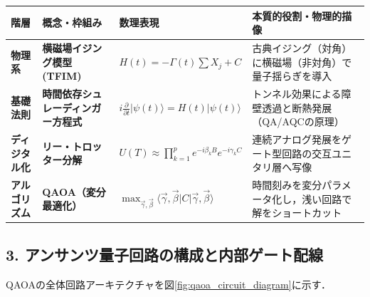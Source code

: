 \documentclass[11pt,a4paper,oneside,openany]{ltjsbook}
\theoremstyle{definition}
\theoremstyle{plain}
\theoremstyle{remark}
\newcommand{\ket}[1]{|#1\rangle}
\newcommand{\bra}[1]{\langle#1|}
\begin{document}
\begin{insightbox}
\centering
\footnotesize
\begin{tabular}{p{1.2cm}p{3.1cm}p{3.3cm}p{5.4cm}}
\toprule
\textbf{階層} & \textbf{概念・枠組み} & \textbf{数理表現} & \textbf{本質的役割・物理的描像} \\
\midrule
\textbf{物理系} & \textbf{横磁場イジング模型 (TFIM)} & $H(t) = - \Gamma(t) \sum X_j + C$ & 古典イジング（対角）に横磁場（非対角）で量子揺らぎを導入 \\
\textbf{基礎法則} & \textbf{時間依存シュレーディンガー方程式} & $i \frac{\partial}{\partial t}\ket{\psi(t)} = H(t)\ket{\psi(t)}$ & トンネル効果による障壁透過と断熱発展（QA/AQCの原理） \\
\textbf{ディジタル化} & \textbf{リー・トロッター分解} & $U(T) \approx \prod_{k=1}^p e^{-i \beta_k B} e^{-i \gamma_k C}$ & 連続アナログ発展をゲート型回路の交互ユニタリ層へ写像 \\
\textbf{アルゴリズム} & \textbf{QAOA（変分最適化）} & $\max_{\vec{\gamma}, \vec{\beta}} \bra{\vec{\gamma}, \vec{\beta}} C \ket{\vec{\gamma}, \vec{\beta}}$ & 時間刻みを変分パラメータ化し，浅い回路で解をショートカット \\
\bottomrule
\end{tabular}
\end{insightbox}

\subsection{3. アンサンツ量子回路の構成と内部ゲート配線}
QAOAの全体回路アーキテクチャを図\ref{fig:qaoa_circuit_diagram}に示す．
\end{document}
